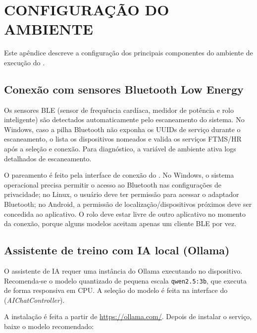 
\chapter{CONFIGURAÇÃO DO AMBIENTE}
\label{ap:ambiente}

Este apêndice descreve a configuração dos principais componentes do ambiente de
execução do \argus{}.

\section{Conexão com sensores Bluetooth Low Energy}
\label{ap:ambiente-ble}

Os sensores BLE (sensor de frequência cardíaca, medidor de potência e rolo
inteligente) são detectados automaticamente pelo escaneamento do sistema. No
Windows, caso a
pilha Bluetooth não exponha os UUIDs de serviço durante o escaneamento, o
\argus{} lista os dispositivos nomeados e valida os serviços FTMS/HR após a
seleção e conexão. Para diagnóstico, a variável de ambiente
 ativa logs detalhados de escaneamento.

O pareamento é feito pela interface de conexão do \argus{}. No Windows, o
sistema operacional precisa permitir o acesso ao Bluetooth nas configurações de
privacidade; no Linux, o usuário deve ter permissão para acessar o adaptador
Bluetooth; no Android, a permissão de localização/dispositivos próximos deve ser
concedida ao aplicativo. O rolo deve estar livre de outro aplicativo no
momento da conexão, porque alguns modelos aceitam apenas um cliente BLE por vez.

\section{Assistente de treino com IA local (Ollama)}
\label{ap:ambiente-ollama}

O assistente de IA requer uma instância do Ollama \cite{ollama2024} executando
no dispositivo. Recomenda-se o modelo quantizado de pequena escala
\texttt{qwen2.5:3b}, que executa de forma responsiva em CPU. A seleção do
modelo é feita na interface do \argus{} (\textit{AIChatController}).

A instalação é feita a partir de \url{https://ollama.com/}. Depois de instalar
o serviço, baixe o modelo recomendado:

